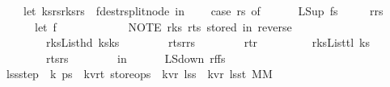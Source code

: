 \begin{isabellebody}
\ \ \ \ let\ {\isacharparenleft}ks{}{\isacharcomma}rs{}{\isacharcomma}r{\isacharcomma}ks{}{\isacharcomma}rs{}{\isacharparenright}\ {\isacharequal}\ f{\isacharbar}{\isachargreater}dest{\isacharunderscore}rsplit{\isacharunderscore}node\ in\isanewline
\ \ \ \ case\ rs{}\ of\isanewline
\ \ \ \ {\isacharbrackleft}{\isacharbrackright}\ {\isasymRightarrow}\ {\isacharparenleft}LS{\isacharunderscore}up\ fs{\isacharprime}{\isacharparenright}\isanewline
\ \ \ \ {\isacharbar}\ r{\isacharprime}{\isacharhash}rs{\isacharprime}\ {\isasymRightarrow}\ {\isacharparenleft}\isanewline
\ \ \ \ \ \ let\ f{\isacharprime}\ {\isacharequal}\ {\isasymlparr}\ \isanewline
\ \ \ \ \ \ \ \ {\isacharparenleft}{\isacharasterisk}\ NOTE\ r{\isacharunderscore}ks{}{\isacharcomma}\ r{\isacharunderscore}ts{}\ stored\ in\ reverse\ {\isacharasterisk}{\isacharparenright}\isanewline
\ \ \ \ \ \ \ \ r{\isacharunderscore}ks{}{\isacharequal}{\isacharparenleft}List{\isachardot}hd\ ks{}{\isacharparenright}{\isacharhash}ks{}{\isacharcomma}\isanewline
\ \ \ \ \ \ \ \ r{\isacharunderscore}ts{}{\isacharequal}r{\isacharhash}rs{}{\isacharcomma}\isanewline
\ \ \ \ \ \ \ \ r{\isacharunderscore}t{\isacharequal}r{\isacharprime}{\isacharcomma}\ \isanewline
\ \ \ \ \ \ \ \ r{\isacharunderscore}ks{}{\isacharequal}{\isacharparenleft}List{\isachardot}tl\ ks{}{\isacharparenright}{\isacharcomma}\isanewline
\ \ \ \ \ \ \ \ r{\isacharunderscore}ts{}{\isacharequal}rs{\isacharprime}\ {\isasymrparr}\ \isanewline
\ \ \ \ \ \ in\isanewline
\ \ \ \ \ \ LS{\isacharunderscore}down\ {\isacharparenleft}r{\isacharprime}{\isacharcomma}f{\isacharprime}{\isacharhash}fs{\isacharprime}{\isacharparenright}\ {\isacharparenright}{\isacharparenright}{\isacharparenright}{\isachardoublequoteclose}\isanewline
\isanewline
\ \ \isanewline
{}\isamarkupfalse%
\ lss{\isacharunderscore}step\ {\isacharcolon}{\isacharcolon}\ {\isachardoublequoteopen}{\isacharprime}k\ ps{}\ {\isasymRightarrow}\ {\isacharparenleft}{\isacharprime}k{\isacharcomma}{\isacharprime}v{\isacharcomma}{\isacharprime}r{\isacharcomma}{\isacharprime}t{\isacharparenright}\ store{\isacharunderscore}ops\ {\isasymRightarrow}\ {\isacharparenleft}{\isacharprime}k{\isacharcomma}{\isacharprime}v{\isacharcomma}{\isacharprime}r{\isacharparenright}\ lss\ {\isasymRightarrow}\ {\isacharparenleft}{\isacharparenleft}{\isacharprime}k{\isacharcomma}{\isacharprime}v{\isacharcomma}{\isacharprime}r{\isacharparenright}\ lss{\isacharcomma}{\isacharprime}t{\isacharparenright}\ MM{\isachardoublequoteclose}\ \isanewline

\end{isabellebody}
